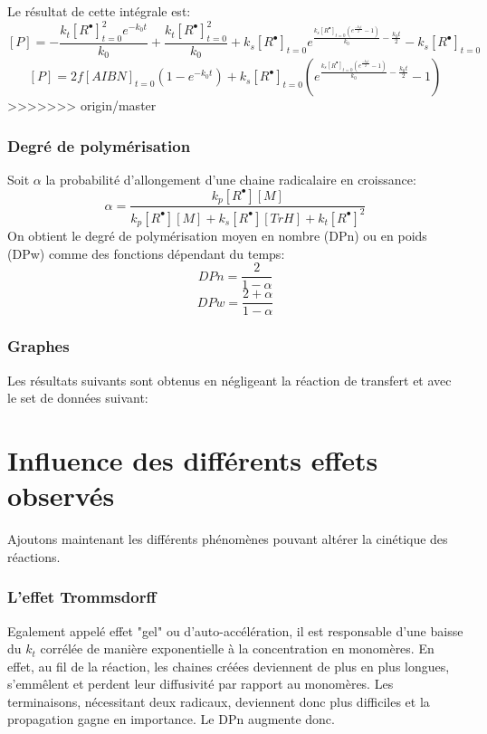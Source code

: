 \documentclass[a4paper,oneside,12pt]{article}
\begin{document}
Le résultat de cette intégrale est:
$$[P]=-\frac{k_t[R^{\bullet}]_{t=0}^2e^{-k_0t}}{k_0}+\frac{k_t[R^{\bullet}]_{t=0}^2}{k_0}+k_s[R^{\bullet}]_{t=0}e^{\frac{k_s[R^{\bullet}]_{t=0}(e^{\frac{-k_0t}{2}}-1)}{k_0}-\frac{k_0t}{2}}-k_s[R^{\bullet}]_{t=0}$$
$$[P]=2f[AIBN]_{t=0}(1-e^{-k_0t})+k_s[R^{\bullet}]_{t=0}(e^{\frac{k_s[R^{\bullet}]_{t=0}(e^{\frac{-k_0t}{2}}-1)}{k_0}-\frac{k_0t}{2}}-1)$$
>>>>>>> origin/master

\section{Degré de polymérisation}
Soit $\alpha$ la probabilité d'allongement d'une chaine radicalaire en croissance: 
$$\alpha=\frac{k_p[R^{\bullet}][M]}{k_p[R^{\bullet}][M]+k_s[R^{\bullet}][TrH]+k_t[R^{\bullet}]^2}$$
On obtient le degré de polymérisation moyen en nombre (DPn) ou en poids (DPw) comme des fonctions dépendant du temps:
$$DPn=\frac{2}{1-\alpha}$$
$$DPw=\frac{2+\alpha}{1-\alpha}$$

\section{Graphes}
Les résultats suivants sont obtenus en négligeant la réaction de transfert et avec le set de données suivant:


\part{Influence des différents effets observés}

Ajoutons maintenant les différents phénomènes pouvant altérer la cinétique des réactions.\\

\section{L'effet Trommsdorff} 
Egalement appelé effet "gel" ou d'auto-accélération, il est responsable d'une baisse du $k_t$ corrélée de manière exponentielle à la concentration en monomères. En effet, au fil de la réaction, les chaines créées deviennent de plus en plus longues, s'emmêlent et perdent leur diffusivité par rapport au monomères. Les terminaisons, nécessitant deux radicaux, deviennent donc plus difficiles et la propagation gagne en importance. Le DPn augmente donc.\\
\end{document}
